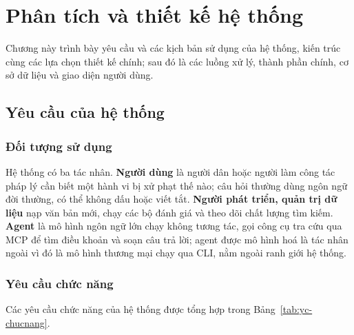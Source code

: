 \chapter{Phân tích và thiết kế hệ thống}
\label{chap:phantich}

\sloppy

Chương này trình bày yêu cầu và các kịch bản sử dụng của hệ thống, kiến trúc cùng các lựa chọn thiết kế chính; sau đó là các luồng xử lý, thành phần chính, cơ sở dữ liệu và giao diện người dùng.

\section{Yêu cầu của hệ thống}
\label{sec:yeucau}

\subsection{Đối tượng sử dụng}

Hệ thống có ba tác nhân. \textbf{Người dùng} là người dân hoặc người làm công tác pháp lý cần biết một hành vi bị xử phạt thế nào; câu hỏi thường dùng ngôn ngữ đời thường, có thể không dấu hoặc viết tắt. \textbf{Người phát triển, quản trị dữ liệu} nạp văn bản mới, chạy các bộ đánh giá và theo dõi chất lượng tìm kiếm. \textbf{Agent} là mô hình ngôn ngữ lớn chạy không tương tác, gọi công cụ tra cứu qua MCP để tìm điều khoản và soạn câu trả lời; agent được mô hình hoá là tác nhân ngoài vì đó là mô hình thương mại chạy qua CLI, nằm ngoài ranh giới hệ thống.

\subsection{Yêu cầu chức năng}

Các yêu cầu chức năng của hệ thống được tổng hợp trong Bảng~\ref{tab:yc-chucnang}.

